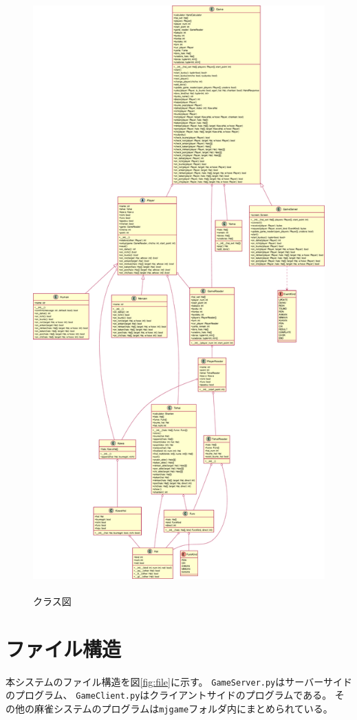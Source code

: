 \documentclass[a4j,titlepage]{jsarticle}
\begin{document}
\begin{figure}[p]
  \centering
  \includegraphics[height=23cm]{images/mahjong.pdf}
  \caption{クラス図}
  \label{fig:class}
\end{figure}

\section{ファイル構造}
本システムのファイル構造を図\ref{fig:file}に示す。
\texttt{GameServer.py}はサーバーサイドのプログラム、
\texttt{GameClient.py}はクライアントサイドのプログラムである。
その他の麻雀システムのプログラムは\texttt{mjgame}フォルダ内にまとめられている。
\end{document}

